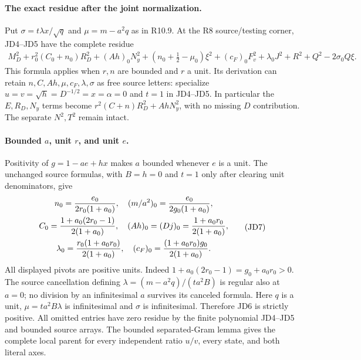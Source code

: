 \paragraph{The exact residue after the joint normalization.}
Put $\sigma=t\lambda x/\sqrt q$ and $\mu=m-a^2q$ as in R10.9.
At the R8 source/testing corner, JD4--JD5 have the complete residue
\[
 \begin{split}
 M_D^2+r_0^2(C_0+n_0)R_D^2+(Ah)_0N_y^2
  +(n_0+\tfrac12-\mu_0)\xi^2
  +(c_F)_0F_v^2+\lambda_0J^2+R^2+Q^2-2\sigma_0Q\xi.
 \end{split}                                                   \tag{JD6}
\]
This formula applies when $r,n$ are bounded and $r$ a unit.  Its
derivation can retain $n,C,Ah,\mu,c_F,\lambda,\sigma$ as free source
letters: specialize $u=v=\sqrt h=D^{-1/2}=x=\alpha=0$ and $t=1$
in JD4--JD5.  In particular the $E,R_D,N_y$ terms become
$r^2(C+n)R_D^2+AhN_y^2$, with no missing $D$ contribution.
The separate $N^2,T^2$ remain intact.

\paragraph{Bounded $a$, unit $r$, and unit $e$.}
Positivity of $g=1-ae+hx$ makes $a$ bounded whenever $e$ is a unit.
The unchanged source formulas, with $B=h=0$ and $t=1$ only after
clearing unit denominators, give
\[
 \begin{gathered}
 n_0={e_0\over2r_0(1+a_0)},\quad
 (m/a^2)_0={e_0\over2g_0(1+a_0)},\\
 C_0={1+a_0(2r_0-1)\over2(1+a_0)},\quad
 (Ah)_0=(Dj)_0={1+a_0r_0\over2(1+a_0)},\\
 \lambda_0={r_0(1+a_0r_0)\over2(1+a_0)},\quad
 (c_F)_0={(1+a_0r_0)g_0\over2(1+a_0)}.                
 \end{gathered}
\tag{JD7}
\]
All displayed pivots are positive units.  Indeed
$1+a_0(2r_0-1)=g_0+a_0r_0>0$.  The source cancellation defining
$\lambda=(m-a^2q)/(ta^2B)$ is regular also at $a=0$; no division
by an infinitesimal $a$ survives its canceled formula.
Here $q$ is a unit, $\mu=ta^2B\lambda$ is infinitesimal and
$\sigma$ is infinitesimal.  Therefore JD6 is strictly positive.
All omitted entries have zero residue by the finite polynomial
JD4--JD5 and bounded source arrays.  The bounded separated-Gram
lemma gives the complete local parent for every independent ratio
$u/v$, every state, and both literal axes.

